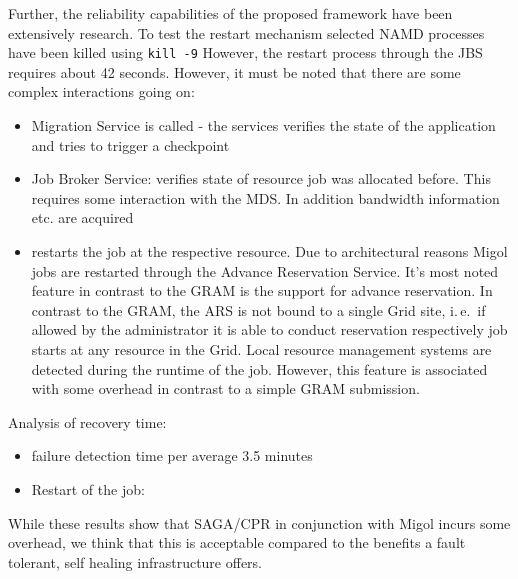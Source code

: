 \documentclass[times, 10pt,twocolumn]{article}
\begin{document}
Further, the reliability capabilities of the proposed framework have been extensively research. 
To test the restart mechanism selected NAMD processes have been killed using \texttt{kill -9}
However, the restart process through the JBS requires about 42 seconds. However, it must be noted that there are some complex interactions going on:
\begin{itemize}
    \item Migration Service is called - the services verifies the state of the application and tries to trigger a checkpoint
    \item Job Broker Service: verifies state of resource job was allocated before. This requires some interaction with the MDS. In addition bandwidth information etc. are acquired
    \item restarts the job at the respective resource. Due to architectural reasons Migol jobs are restarted through the Advance Reservation Service. It's most noted feature in contrast to the GRAM is the support for advance reservation. In contrast to the GRAM, the ARS is not bound to a single Grid site, i.\,e.\ if allowed by the administrator it is able to conduct reservation respectively job starts at any resource in the Grid. Local resource management systems are detected during the runtime of the job. However, this feature is associated with some overhead in contrast to a simple GRAM submission.
\end{itemize}

Analysis of recovery time:
\begin{itemize}
	\item failure detection time per average 3.5 minutes
	\item Restart of the job:
\end{itemize}        

While these results show that SAGA/CPR in conjunction with Migol incurs some 
overhead, we think that this is acceptable compared to the benefits a fault tolerant, 
self healing infrastructure offers.


\end{document}
